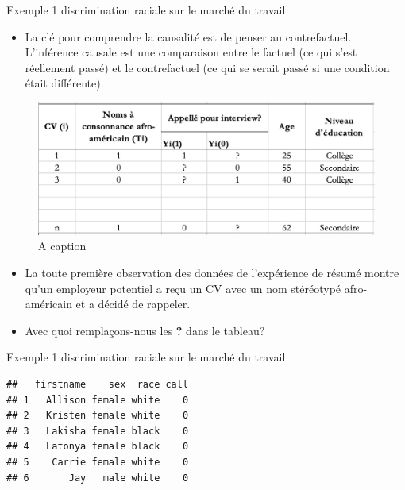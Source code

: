 \documentclass[ignorenonframetext,]{beamer}
\providecommand{\tightlist}{%
  \setlength{\itemsep}{0pt}\setlength{\parskip}{0pt}}
\begin{document}
\begin{frame}{Exemple 1 discrimination raciale sur le marché du travail}
\protect\hypertarget{exemple-1-discrimination-raciale-sur-le-marche-du-travail-4}{}

\begin{itemize}
\tightlist
\item
  La clé pour comprendre la causalité est de penser au contrefactuel.
  L'inférence causale est une comparaison entre le factuel (ce qui s'est
  réellement passé) et le contrefactuel (ce qui se serait passé si une
  condition était différente).
\end{itemize}

\begin{figure}
\includegraphics[width=1\linewidth]{factuel_contrafactuel} \caption{A caption}\label{fig:pressure}
\end{figure}

\begin{itemize}
\item
  La toute première observation des données de l'expérience de résumé
  montre qu'un employeur potentiel a reçu un CV avec un nom stéréotypé
  afro-américain et a décidé de rappeler.
\item
  Avec quoi remplaçons-nous les \textbf{?} dans le tableau?
\end{itemize}

\end{frame}

\begin{frame}[fragile]{Exemple 1 discrimination raciale sur le marché du
travail}
\protect\hypertarget{exemple-1-discrimination-raciale-sur-le-marche-du-travail-5}{}

\begin{verbatim}
##   firstname    sex  race call
## 1   Allison female white    0
## 2   Kristen female white    0
## 3   Lakisha female black    0
## 4   Latonya female black    0
## 5    Carrie female white    0
## 6       Jay   male white    0
\end{verbatim}

\end{frame}
\end{document}
